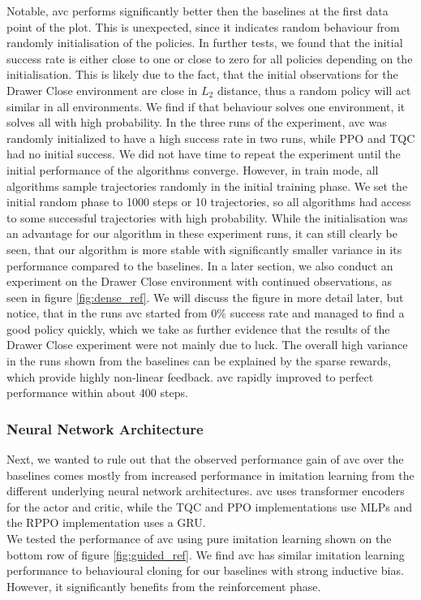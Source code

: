 Notable, \ac{avc} performs significantly better then the baselines at the first data point of the plot. This is unexpected, since it indicates 
random behaviour from randomly initialisation of the policies. In further tests, we found that the initial success rate is either close to one or close to zero for all policies depending 
on the initialisation. This is likely 
due to the fact, that the initial observations for the Drawer Close environment are close in $L_2$ distance, thus a random policy will act similar in all environments. We find if that behaviour 
solves one environment, it solves all with high probability. In the three runs of the experiment, \ac{avc} was randomly initialized to have a high success rate in two runs, while PPO and TQC had no 
initial success. We did not have time to repeat the experiment until the initial performance of the algorithms converge. However, in train mode, 
all algorithms sample trajectories randomly in the initial training phase. 
We set the initial random phase to 1000 steps or 10 trajectories, so all algorithms had access to some successful trajectories with high probability. While the initialisation was an advantage 
for our algorithm in these experiment runs, it can still clearly be seen, that our algorithm is more stable with significantly smaller variance in its performance compared to the baselines. In a later 
section, we also conduct an experiment on the Drawer Close environment with continued observations, as seen in figure \ref{fig:dense_ref}. We will discuss the figure in more detail later, but 
notice, that in the runs \ac{avc} started from $0 \%$ success rate and managed to find a good policy quickly, which we take as further evidence that the results of the Drawer Close experiment were not 
mainly due to luck. The overall high variance in the runs shown from the baselines can be explained by the sparse rewards, which provide highly non-linear feedback. 
\ac{avc} rapidly improved to perfect performance within about 400 steps. \\

\subsubsection{Neural Network Architecture}
Next, we wanted to rule out that the observed performance gain of \ac{avc} over the baselines comes mostly from increased performance in imitation learning 
from the different underlying neural network architectures. \ac{avc} uses transformer encoders for the actor and 
critic, while the TQC and PPO implementations use MLPs and the RPPO implementation uses a GRU.\\ 
We tested the performance of \ac{avc} using pure imitation learning shown on the bottom row of
figure \ref{fig:guided_ref}. We find \ac{avc} has similar imitation learning performance to behavioural cloning for our baselines with strong inductive bias. However, it significantly benefits from the reinforcement phase.\\

